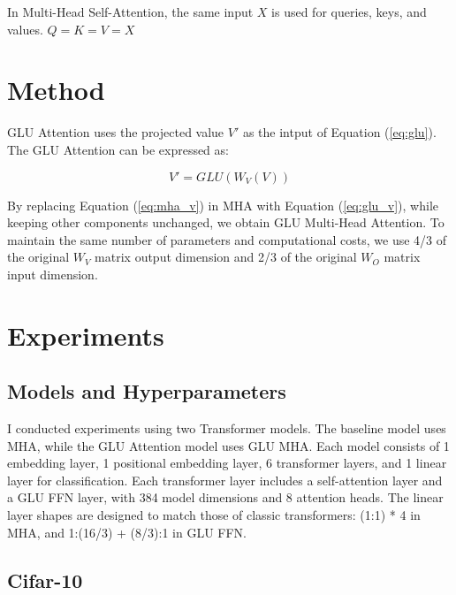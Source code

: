 \documentclass[11pt]{article}
\begin{document}
In Multi-Head Self-Attention, the same input $X$ is used for queries, keys, and values. $Q = K = V = X$

\section{Method}
GLU Attention uses the projected value $V'$ as the intput of Equation (\ref{eq:glu}). The GLU Attention can be expressed as:

\begin{equation}
V' = GLU(W_V(V))
\label{eq:glu_v}
\end{equation}

By replacing Equation (\ref{eq:mha_v}) in MHA with Equation (\ref{eq:glu_v}), while keeping other components unchanged, we obtain GLU Multi-Head Attention. To maintain the same number of parameters and computational costs, we use 4/3 of the original $W_V$ matrix output dimension and 2/3 of the original $W_O$ matrix input dimension.

\section{Experiments}



\subsection{Models and Hyperparameters}

I conducted experiments using two Transformer models. The baseline model uses MHA, while the GLU Attention model uses GLU MHA. Each model consists of 1 embedding layer, 1 positional embedding layer, 6 transformer layers, and 1 linear layer for classification. Each transformer layer includes a self-attention layer and a GLU FFN layer, with 384 model dimensions and 8 attention heads. The linear layer shapes are designed to match those of classic transformers: (1:1) * 4 in MHA, and 1:(16/3) + (8/3):1 in GLU FFN.

\subsection{Cifar-10}
\end{document}
